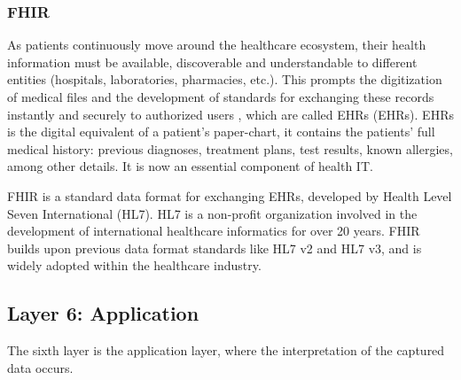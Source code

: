 \subsubsection{\acf{FHIR}}

As patients continuously move around the healthcare ecosystem, their health information must be available, discoverable and understandable to different entities (hospitals, laboratories, pharmacies, etc.). This prompts the digitization of medical files and the development of standards for exchanging these records instantly and securely to authorized users \cite{HL72019}, which are called \acl{EHR}s (\acs{EHR}s). \acs{EHR}s is the digital equivalent of a patient's paper-chart, it contains the patients' full medical history: previous diagnoses, treatment plans, test results, known allergies, among other details. It is now an essential component of health IT. 

\acf{FHIR} is a standard data format for exchanging \acs{EHR}s, developed by Health Level Seven International (HL7). HL7 is a non-profit organization involved in the development of international healthcare informatics for over 20 years. \acs{FHIR} builds upon previous data format standards like HL7 v2 and HL7 v3, and is widely adopted within the healthcare industry. 

\subsection{Layer 6: Application}
\label{sec:iot-model-layer6}



The sixth layer is the application layer, where the interpretation of the captured data occurs. 


